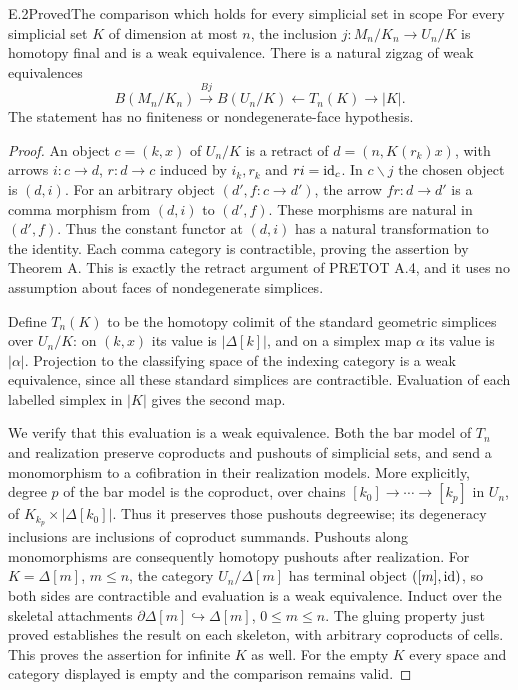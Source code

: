 \begin{claim}{E.2}{Proved}{The comparison which holds for every simplicial set in scope}
\label{E:comparison}
For every simplicial set $K$ of dimension at most $n$, the inclusion
$j:M_n/K_n\to U_n/K$ is homotopy final and is a weak equivalence.
There is a natural zigzag of weak equivalences
\[
 B(M_n/K_n)\xrightarrow{Bj}B(U_n/K)
 \longleftarrow T_n(K)\longrightarrow |K|.
\]
The statement has no finiteness or nondegenerate-face hypothesis.
\end{claim}
\begin{proof}
An object $c=(k,x)$ of $U_n/K$ is a retract of
$d=(n,K(r_k)x)$, with arrows $i:c\to d$, $r:d\to c$ induced
by $i_k,r_k$ and $ri=\mathrm{id}_c$. In $c\backslash j$ the chosen object
is $(d,i)$. For an arbitrary object $(d',f:c\to d')$, the arrow
$fr:d\to d'$ is a comma morphism from $(d,i)$ to $(d',f)$.
These morphisms are natural in $(d',f)$. Thus the constant functor
at $(d,i)$ has a natural transformation to the identity. Each comma
category is contractible, proving the assertion by Theorem A.
This is exactly the retract argument of PRETOT A.4, and it uses no
assumption about faces of nondegenerate simplices.

Define $T_n(K)$ to be the homotopy colimit of the standard geometric
simplices over $U_n/K$: on $(k,x)$ its value is $|\Delta[k]|$, and
on a simplex map $\alpha$ its value is $|\alpha|$. Projection to
the classifying space of the indexing category is a weak equivalence,
since all these standard simplices are contractible. Evaluation of
each labelled simplex in $|K|$ gives the second map.

We verify that this evaluation is a weak equivalence. Both the bar
model of $T_n$ and realization preserve coproducts and pushouts of
simplicial sets, and send a monomorphism to a cofibration in their
realization models. More explicitly, degree $p$ of the bar model is
the coproduct, over chains $[k_0]\to\cdots\to[k_p]$ in $U_n$, of
$K_{k_p}\times|\Delta[k_0]|$. Thus it preserves those pushouts
degreewise; its degeneracy inclusions are inclusions of coproduct
summands. Pushouts along monomorphisms are consequently homotopy
pushouts after realization. For $K=\Delta[m]$, $m\leq n$, the
category $U_n/\Delta[m]$ has terminal object $([m],\mathrm{id})$, so
both sides are contractible and evaluation is a weak equivalence.
Induct over the skeletal attachments
$\partial\Delta[m]\hookrightarrow\Delta[m]$, $0\leq m\leq n$.
The gluing property just proved establishes the result on each
skeleton, with arbitrary coproducts of cells. This proves the
assertion for infinite $K$ as well. For the empty $K$ every space
and category displayed is empty and the comparison remains valid.
\end{proof}

